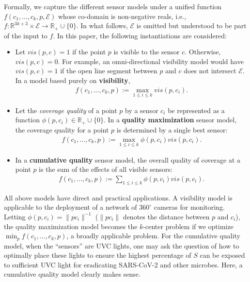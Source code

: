 Formally, we capture the different sensor models under a unified function $f(c_1, \ldots, c_k, p, \mathcal E)$ whose co-domain is non-negative reals, i.e., $f: \mathbb R^{3k + 3} \times \mathcal E \to \mathbb R_+\cup\{0\}$. In what follows, $\mathcal E$ is omitted but understood to be part of the input to $f$. In this paper, the following instantiations are considered:
\begin{itemize}[leftmargin=4mm]
    \item Let $vis(p, c) = 1$ if the point $p$ is visible to the sensor $c$. Otherwise, $vis(p, c) = 0$. For example, an omni-directional visibility model would have $vis(p, c) = 1$ if the open line segment between $p$ and $c$ does not intersect $\mathcal E$. In a model based purely on \textbf{visibility},  
    \begin{align}
    f(c_1, \ldots, c_k, p) := \max_{1\le i \le k}vis(p, c_i).\label{f:surf-1}
    \end{align}
    \item Let the \emph{coverage quality} of a point $p$ by a sensor $c_i$ be represented as a function $\phi(p, c_i) \in \mathbb R_+\cup\{0\}$. In a \textbf{quality maximization} sensor model,  the coverage quality for a point $p$ is determined by a single best sensor:  
    \begin{align}f(c_1, \ldots, c_k, p) := \max_{1\le i \le k} \phi(p, c_i)vis(p, c_i).\label{f:surf-2}
    \end{align}
    \item In a \textbf{cumulative quality} sensor model, the overall quality of coverage at a point $p$ is the sum of the effects of all visible sensors:
    \begin{align}f(c_1, \ldots, c_k, p) := \sum_{1\le i \le k}\phi(p, c_i)vis(p, c_i).\label{f:surf-3}
    \end{align}
\end{itemize}



All above models have direct and practical applications. 
A visibility model is applicable to the deployment of a network of $360^{\circ}$ cameras for monitoring. 
Letting $\phi(p, c_i) = \lVert pc_i\rVert^{-1}$ ($\lVert pc_i\rVert$ denotes the distance between $p$ and $c_i$), 
the quality maximization model becomes the $k$-center problem \cite{weber1929theory} if we optimize $\min_p f(c_1, \ldots, c_k, p)$, 
a broadly applicable problem. For the cumulative quality model, when the ``sensors'' are UVC lights, 
one may ask the question of how to optimally place these lights to ensure the highest percentage of $S$ can be exposed to sufficient UVC light for eradicating SARS-CoV-2 and other microbes. 
Here, a cumulative quality model clearly makes sense. 

